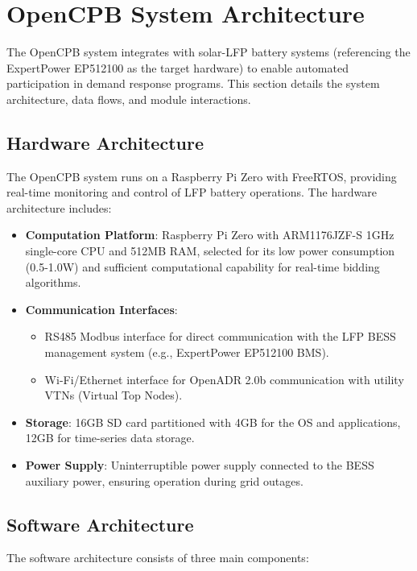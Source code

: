 \documentclass[11pt,a4paper]{article}
\begin{document}
\section{OpenCPB System Architecture}
The OpenCPB system integrates with solar-LFP battery systems (referencing the ExpertPower EP512100 as the target hardware) to enable automated participation in demand response programs. This section details the system architecture, data flows, and module interactions.

\subsection{Hardware Architecture}
The OpenCPB system runs on a Raspberry Pi Zero with FreeRTOS, providing real-time monitoring and control of LFP battery operations. The hardware architecture includes:

\begin{itemize}
    \item \textbf{Computation Platform}: Raspberry Pi Zero with ARM1176JZF-S 1GHz single-core CPU and 512MB RAM, selected for its low power consumption (0.5-1.0W) and sufficient computational capability for real-time bidding algorithms.
    \item \textbf{Communication Interfaces}: 
    \begin{itemize}
        \item RS485 Modbus interface for direct communication with the LFP BESS management system (e.g., ExpertPower EP512100 BMS).
        \item Wi-Fi/Ethernet interface for OpenADR 2.0b communication with utility VTNs (Virtual Top Nodes).
    \end{itemize}
    \item \textbf{Storage}: 16GB SD card partitioned with 4GB for the OS and applications, 12GB for time-series data storage.
    \item \textbf{Power Supply}: Uninterruptible power supply connected to the BESS auxiliary power, ensuring operation during grid outages.
\end{itemize}

\subsection{Software Architecture}
The software architecture consists of three main components:
\end{document}

